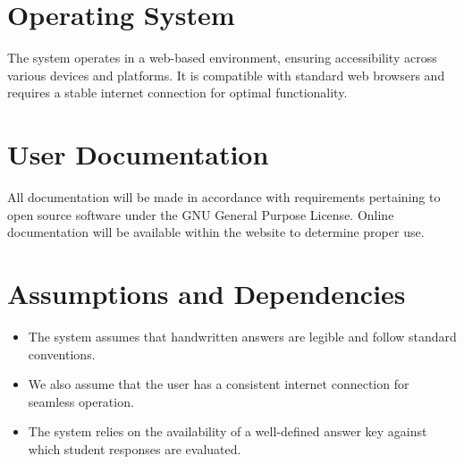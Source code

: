 \section{Operating System}
The system operates in a web-based environment, ensuring accessibility across various devices and platforms. It is compatible with standard web browsers and requires a stable internet connection for optimal functionality.

\section{User Documentation}
 All documentation will be made in accordance with requirements pertaining to open source software
 under the GNU General Purpose License. Online documentation will be available within the website
 to determine proper use.

 \section{Assumptions and Dependencies}
 
 \begin{itemize}
     \item The system assumes that handwritten answers are legible and follow standard conventions.
     \item We also assume that the user has a consistent internet connection for seamless operation.
     \item The system relies on the availability of a well-defined answer key against which student responses are evaluated.
 \end{itemize}